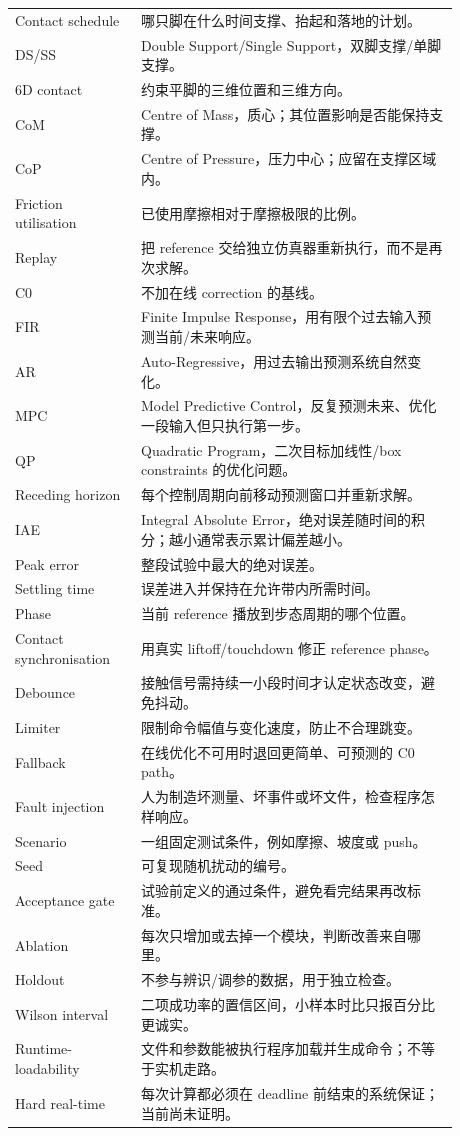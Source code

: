 \documentclass[UTF8,11pt,a4paper]{ctexart}
\begin{document}
\begin{longtable}{@{}p{0.25\linewidth}p{0.63\linewidth}@{}}
Contact schedule & 哪只脚在什么时间支撑、抬起和落地的计划。\\
DS/SS & Double Support/Single Support，双脚支撑/单脚支撑。\\
6D contact & 约束平脚的三维位置和三维方向。\\
CoM & Centre of Mass，质心；其位置影响是否能保持支撑。\\
CoP & Centre of Pressure，压力中心；应留在支撑区域内。\\
Friction utilisation & 已使用摩擦相对于摩擦极限的比例。\\
Replay & 把 reference 交给独立仿真器重新执行，而不是再次求解。\\
C0 & 不加在线 correction 的基线。\\
FIR & Finite Impulse Response，用有限个过去输入预测当前/未来响应。\\
AR & Auto-Regressive，用过去输出预测系统自然变化。\\
MPC & Model Predictive Control，反复预测未来、优化一段输入但只执行第一步。\\
QP & Quadratic Program，二次目标加线性/box constraints 的优化问题。\\
Receding horizon & 每个控制周期向前移动预测窗口并重新求解。\\
IAE & Integral Absolute Error，绝对误差随时间的积分；越小通常表示累计偏差越小。\\
Peak error & 整段试验中最大的绝对误差。\\
Settling time & 误差进入并保持在允许带内所需时间。\\
Phase & 当前 reference 播放到步态周期的哪个位置。\\
Contact synchronisation & 用真实 liftoff/touchdown 修正 reference phase。\\
Debounce & 接触信号需持续一小段时间才认定状态改变，避免抖动。\\
Limiter & 限制命令幅值与变化速度，防止不合理跳变。\\
Fallback & 在线优化不可用时退回更简单、可预测的 C0 path。\\
Fault injection & 人为制造坏测量、坏事件或坏文件，检查程序怎样响应。\\
Scenario & 一组固定测试条件，例如摩擦、坡度或 push。\\
Seed & 可复现随机扰动的编号。\\
Acceptance gate & 试验前定义的通过条件，避免看完结果再改标准。\\
Ablation & 每次只增加或去掉一个模块，判断改善来自哪里。\\
Holdout & 不参与辨识/调参的数据，用于独立检查。\\
Wilson interval & 二项成功率的置信区间，小样本时比只报百分比更诚实。\\
Runtime-loadability & 文件和参数能被执行程序加载并生成命令；不等于实机走路。\\
Hard real-time & 每次计算都必须在 deadline 前结束的系统保证；当前尚未证明。\\
\bottomrule
\end{longtable}
\end{document}
